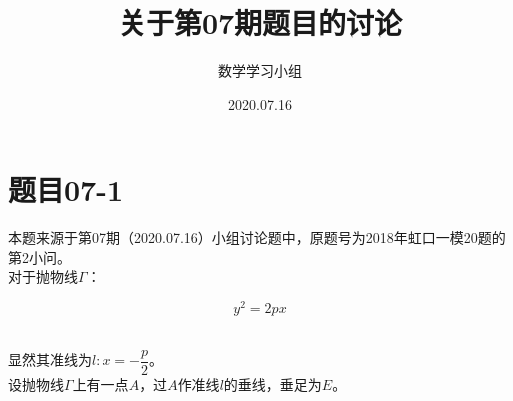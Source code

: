 \documentclass[UTF8]{ctexart}
\title{关于第07期题目的讨论}
\author{数学学习小组}
\date{2020.07.16}
\begin{document}
\maketitle

\newpage

\tableofcontents

\newpage

\setlength{\parindent}{0pt}
\setlength{\columnseprule}{0.4pt}
\setlength{\columnsep}{40pt}

\section{题目07-1}
    本题来源于第07期（2020.07.16）小组讨论题中，原题号为2018年虹口一模20题的第2小问。\\[3mm]
    对于抛物线$\Gamma$：
    \begin{large}
        \begin{equation*}
            y^2=2px
        \end{equation*}
    \end{large}\\
    显然其准线为$l:x=-\dfrac{p}{2}$。\\[3mm]
    设抛物线$\Gamma$上有一点$A$，过$A$作准线$l$的垂线，垂足为$E$。\\[3mm]
\end{document}
